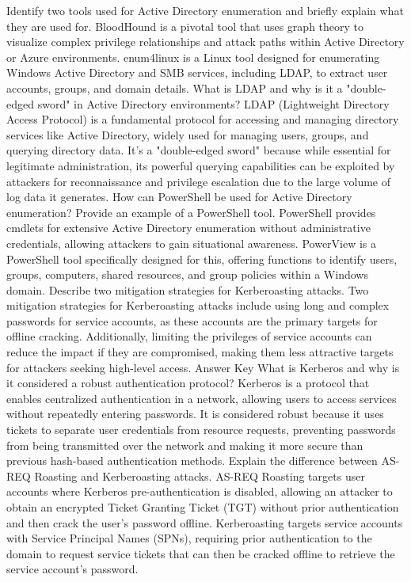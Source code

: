 Identify two tools used for Active Directory enumeration and briefly explain what they are used for. BloodHound is a pivotal tool that uses graph theory to visualize complex privilege relationships and attack paths within Active Directory or Azure environments. enum4linux is a Linux tool designed for enumerating Windows Active Directory and SMB services, including LDAP, to extract user accounts, groups, and domain details.
What is LDAP and why is it a "double-edged sword" in Active Directory environments? LDAP (Lightweight Directory Access Protocol) is a fundamental protocol for accessing and managing directory services like Active Directory, widely used for managing users, groups, and querying directory data. It's a "double-edged sword" because while essential for legitimate administration, its powerful querying capabilities can be exploited by attackers for reconnaissance and privilege escalation due to the large volume of log data it generates.
How can PowerShell be used for Active Directory enumeration? Provide an example of a PowerShell tool. PowerShell provides cmdlets for extensive Active Directory enumeration without administrative credentials, allowing attackers to gain situational awareness. PowerView is a PowerShell tool specifically designed for this, offering functions to identify users, groups, computers, shared resources, and group policies within a Windows domain.
Describe two mitigation strategies for Kerberoasting attacks. Two mitigation strategies for Kerberoasting attacks include using long and complex passwords for service accounts, as these accounts are the primary targets for offline cracking. Additionally, limiting the privileges of service accounts can reduce the impact if they are compromised, making them less attractive targets for attackers seeking high-level access.
Answer Key
What is Kerberos and why is it considered a robust authentication protocol? Kerberos is a protocol that enables centralized authentication in a network, allowing users to access services without repeatedly entering passwords. It is considered robust because it uses tickets to separate user credentials from resource requests, preventing passwords from being transmitted over the network and making it more secure than previous hash-based authentication methods.
Explain the difference between AS-REQ Roasting and Kerberoasting attacks. AS-REQ Roasting targets user accounts where Kerberos pre-authentication is disabled, allowing an attacker to obtain an encrypted Ticket Granting Ticket (TGT) without prior authentication and then crack the user's password offline. Kerberoasting targets service accounts with Service Principal Names (SPNs), requiring prior authentication to the domain to request service tickets that can then be cracked offline to retrieve the service account's password.
